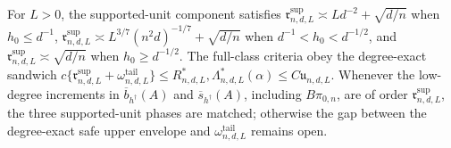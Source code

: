 For \(L>0\), the supported-unit component satisfies \(\mathfrak r^{\mathrm{sup}}_{n,d,L}\asymp Ld^{-2}+\sqrt{d/n}\) when \(h_0\le d^{-1}\), \(\mathfrak r^{\mathrm{sup}}_{n,d,L}\asymp L^{3/7}(n^2d)^{-1/7}+\sqrt{d/n}\) when \(d^{-1}<h_0<d^{-1/2}\), and \(\mathfrak r^{\mathrm{sup}}_{n,d,L}\asymp\sqrt{d/n}\) when \(h_0\ge d^{-1/2}\). The full-class criteria obey the degree-exact sandwich \(c\{\mathfrak r^{\mathrm{sup}}_{n,d,L}+\omega^{\mathrm{tail}}_{n,d,L}\}\le R^*_{n,d,L},\Lambda^*_{n,d,L}(\alpha)\le C\mathfrak u_{n,d,L}\). Whenever the low-degree increments in \(\overline b_{h^\dagger}(A)\) and \(\overline s_{h^\dagger}(A)\), including \(B\pi_{0,n}\), are of order \(\mathfrak r^{\mathrm{sup}}_{n,d,L}\), the three supported-unit phases are matched; otherwise the gap between the degree-exact safe upper envelope and \(\omega^{\mathrm{tail}}_{n,d,L}\) remains open.